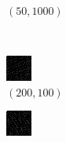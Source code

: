 \documentclass[a4paper, landscape]{article}
\begin{document}
\begin{figure}[H]
\begin{subfigure}{0.07\linewidth}
        \caption*{$(50, 1000)$}
    \end{subfigure}
    \\
    \begin{subfigure}{0.07\linewidth}
        \centering
        \includegraphics[width=\linewidth]{omp/k = 200, m = 100.png}
        \caption*{$(200, 100)$}
    \end{subfigure}
    \begin{subfigure}{0.07\linewidth}
        \centering
        \includegraphics[width=\linewidth]{omp/k = 200, m = 200.png}

\end{subfigure}
\end{figure}
\end{document}
